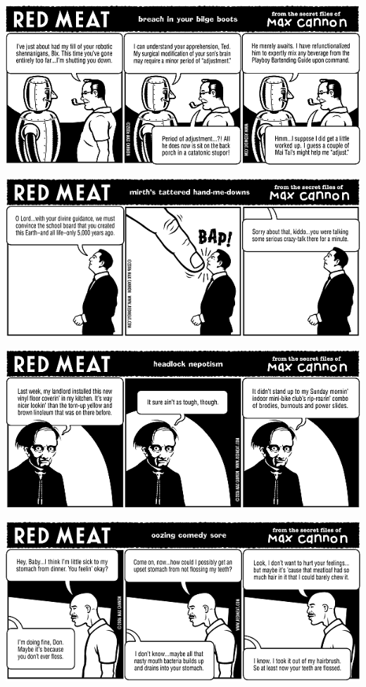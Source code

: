 \documentclass[a4paper,twoside,11pt]{article}
\begin{document}
\includegraphics[width=\textwidth]{redmeat_2006-02-14.png}



\includegraphics[width=\textwidth]{redmeat_2006-02-21.png}



\includegraphics[width=\textwidth]{redmeat_2006-02-28.png}



\includegraphics[width=\textwidth]{redmeat_2006-03-07.png}
\end{document}
